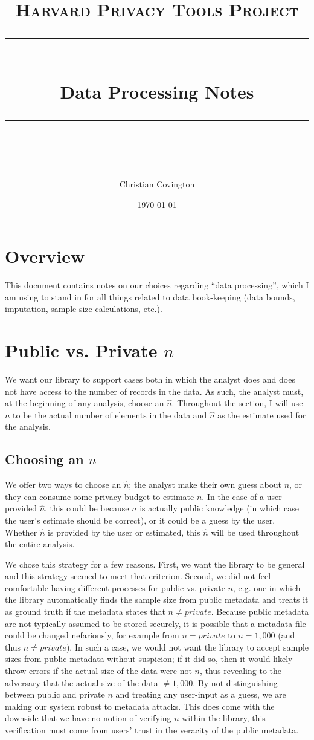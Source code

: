 \documentclass[11pt]{scrartcl} %
\title{
	\normalfont\normalsize
	\textsc{Harvard Privacy Tools Project}\\ %
	\vspace{25pt} %
	\rule{\linewidth}{0.5pt}\\ %
	\vspace{20pt} %
	{\huge Data Processing Notes}\\ %
	\vspace{12pt} %
	\rule{\linewidth}{2pt}\\ %
	\vspace{12pt} %
}
\author{\LARGE Christian Covington} %
\date{\normalsize\today} %
\begin{document}
\maketitle

\section{Overview}
This document contains notes on our choices regarding ``data processing'', which I am using to stand in
for all things related to data book-keeping (data bounds, imputation, sample size calculations, etc.).

\section{Public vs. Private $n$}
We want our library to support cases both in which the analyst does and does not have access to
the number of records in the data. As such, the analyst must, at the beginning of any analysis, choose an $\hat{n}$.
Throughout the section, I will use $n$ to be the actual number of elements in the data and
$\hat{n}$ as the estimate used for the analysis.

\subsection{Choosing an $n$}
We offer two ways to choose an $\hat{n}$; the analyst make their own guess about $n$, or they can
consume some privacy budget to estimate $n$. In the case of a user-provided $\hat{n}$, this could be because
$n$ is actually public knowledge (in which case the user's estimate should be correct), or it could be
a guess by the user. Whether $\hat{n}$ is provided by the user or estimated, this $\hat{n}$ will be used throughout
the entire analysis. \newline

We chose this strategy for a few reasons. First, we want the library to be general and this strategy
seemed to meet that criterion. Second, we did not feel comfortable having different processes for
public vs. private $n$, e.g. one in which the library automatically finds the sample size from public metadata and treats
it as ground truth if the metadata states that $n \neq private$.
Because public metadata are not typically assumed to be stored securely, it is
possible that a metadata file could be changed nefariously, for example from $n = private$ to $n = 1,000$
(and thus $n \neq private$).
In such a case, we would not want the library to accept sample sizes from public metadata without
suspicion; if it did so, then it would likely throw errors if the actual size of the data were not $n$, thus
revealing to the adversary that the actual size of the data $\neq 1,000$.
By not distinguishing between public and private $n$ and treating any user-input as a guess,
we are making our system robust to metadata attacks.
This does come with the downside that we have no notion of verifying $n$ within the library, this
verification must come from users' trust in the veracity of the public metadata.
\end{document}
